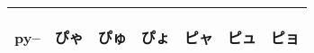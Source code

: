 \begin{table}[H]
\begin{tabular}{l|ccc|ccc}
        py--   & {\begin{CJK}{UTF8}{min} ぴゃ \end{CJK}} & {\begin{CJK}{UTF8}{min} ぴゅ \end{CJK}} & {\begin{CJK}{UTF8}{min} ぴょ \end{CJK}} & {\begin{CJK}{UTF8}{min} ピャ \end{CJK}} & {\begin{CJK}{UTF8}{min} ピュ \end{CJK}} & {\begin{CJK}{UTF8}{min} ピョ \end{CJK}} \\
		\bottomrule
	\end{tabular}
\end{table}


